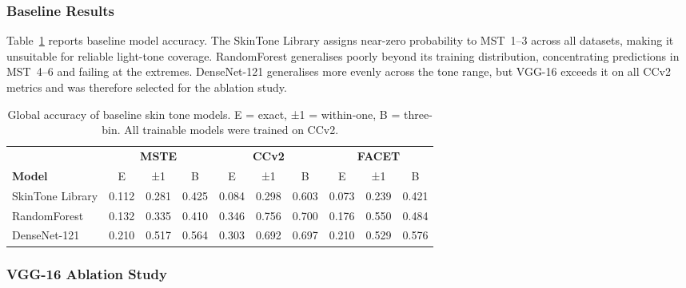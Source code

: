 \subsubsection{Baseline Results}
\label{subsubsec:skintone_baseline}

Table~\ref{tab:skintone_baseline} reports baseline model accuracy. The SkinTone Library assigns near-zero probability to MST~1--3 across all datasets, making it unsuitable for reliable light-tone coverage. RandomForest generalises poorly beyond its training distribution, concentrating predictions in MST~4--6 and failing at the extremes. DenseNet-121 generalises more evenly across the tone range, but VGG-16 exceeds it on all CCv2 metrics and was therefore selected for the ablation study.

\begin{table}[H]
	\centering
	\footnotesize
	\begin{tabular}{lccccccccc}
		\toprule
		                 & \multicolumn{3}{c}{\textbf{MSTE}} & \multicolumn{3}{c}{\textbf{CCv2}} & \multicolumn{3}{c}{\textbf{FACET}}                                                 \\
		\cmidrule(lr){2-4} \cmidrule(lr){5-7} \cmidrule(lr){8-10}
		\textbf{Model}   & E                                 & ±1                                & B                                  & E     & ±1    & B     & E     & ±1    & B     \\
		\midrule
		SkinTone Library & 0.112                             & 0.281                             & 0.425                              & 0.084 & 0.298 & 0.603 & 0.073 & 0.239 & 0.421 \\
		RandomForest     & 0.132                             & 0.335                             & 0.410                              & 0.346 & 0.756 & 0.700 & 0.176 & 0.550 & 0.484 \\
		DenseNet-121     & 0.210                             & 0.517                             & 0.564                              & 0.303 & 0.692 & 0.697 & 0.210 & 0.529 & 0.576 \\
		\bottomrule
	\end{tabular}
	\caption{Global accuracy of baseline skin tone models. E = exact, ±1 = within-one,
		B = three-bin. All trainable models were trained on CCv2.}
	\label{tab:skintone_baseline}
\end{table}

\subsubsection{VGG-16 Ablation Study}
\label{subsec:vgg16_ablation}

